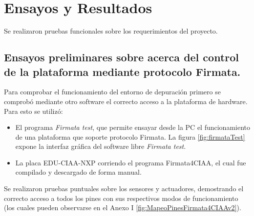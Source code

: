 
\chapter{Ensayos y Resultados} %

\label{Chapter4} %


Se realizaron pruebas funcionales sobre los requerimientos del proyecto.

\section{Ensayos preliminares sobre acerca del control de la plataforma mediante protocolo Firmata.}
\label{sec:Ensayos de control de la plataforma mediante protocolo Firmata}

Para comprobar el funcionamiento del entorno de depuración primero se comprobó mediante otro software el correcto acceso a la plataforma de hardware. Para esto se utilizó:

\begin{itemize}
	\item El programa \emph{Firmata test}\citep{firmataTest}, que permite ensayar desde la PC el funcionamiento de una plataforma que soporte protocolo Firmata. La figura \ref{fig:firmataTest} expone la interfaz gráfica del software libre \emph{Firmata test}.
	\item La placa EDU-CIAA-NXP corriendo el programa Firmata4CIAA, el cual fue compilado y descargado de forma manual.
\end{itemize}

Se realizaron pruebas puntuales sobre los sensores y actuadores, demostrando el correcto acceso a todos los pines con sus respectivos modos de funcionamiento (los cuales pueden observarse en el Anexo I \ref{fig:MapeoPinesFirmata4CIAAv2}). 

